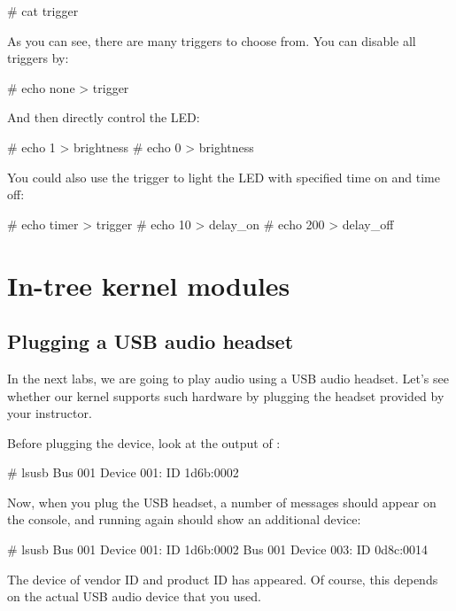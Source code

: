 {\begin{bashinput}
# cat trigger
\end{bashinput}

As you can see, there are many triggers to choose from.
You can disable all triggers by:

\begin{bashinput}
# echo none > trigger
\end{bashinput}

And then directly control the LED:

\begin{bashinput}
# echo 1 > brightness
# echo 0 > brightness
\end{bashinput}

You could also use the  trigger to light the LED
with specified time on and time off:

\begin{bashinput}
# echo timer > trigger
# echo 10 > delay_on
# echo 200 > delay_off
\end{bashinput}

\section{In-tree kernel modules}
\subsection{Plugging a USB audio headset}

In the next labs, we are going to play audio using a USB audio headset.
Let's see whether our kernel supports such hardware by plugging the
headset provided by your instructor.

Before plugging the device, look at the output of :

\begin{bashinput}
# lsusb
Bus 001 Device 001: ID 1d6b:0002
\end{bashinput}

Now, when you plug the USB headset, a number of messages should appear
on the console, and running  again should show an
additional device:

\begin{bashinput}
# lsusb
Bus 001 Device 001: ID 1d6b:0002
Bus 001 Device 003: ID 0d8c:0014
\end{bashinput}

The device of vendor ID  and product ID  has
appeared. Of course, this depends on the actual USB audio device
that you used.

}
